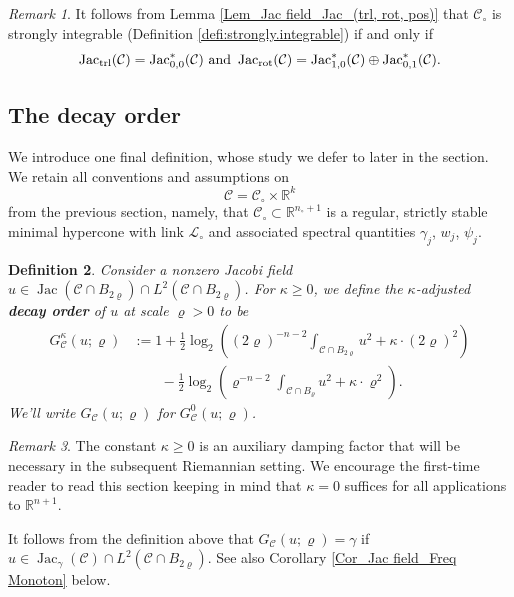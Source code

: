 \documentclass[11pt, letterpaper, reqno]{amsart}
\numberwithin{equation}{section}
\newtheorem{Def}{Definition}[section]
\theoremstyle{remark}
\newtheorem{Rem}[Def]{Remark}
\newcommand{\RR}{\mathbb{R}}
\newcommand{\cC}{\mathcal{C}}
\newcommand{\cL}{\mathcal{L}}
\newcommand{\Jac}{\operatorname{Jac}}
\begin{document}
\begin{Rem} \label{rema:strongly.integrable}
It follows from Lemma \ref{Lem_Jac field_Jac_(trl, rot, pos)} that $\cC_\circ$ is strongly integrable (Definition \ref{defi:strongly.integrable}) if and only if
\[ \Jac_\textnormal{trl}(\cC) = \Jac^*_{0,0}(\cC) \text{ and } \Jac_\textnormal{rot}(\cC) = \Jac^*_{1,0}(\cC) \oplus \Jac^*_{0,1}(\cC). \] 
\end{Rem}




\subsection{The decay order}

We introduce one final definition, whose study we defer to later in the section. We retain all   conventions and assumptions on
\[ \cC = \cC_\circ \times \RR^k \]
from the previous section, namely, that $\cC_\circ \subset \RR^{n_\circ+1}$ is a regular, strictly stable minimal hypercone with link $\cL_\circ$ and associated spectral quantities $\gamma_j$, $w_j$, $\psi_j$.

\begin{Def} \label{Def_doubling constant} \label{defi:linear.doubling.constant}
    Consider a nonzero Jacobi field $u \in \Jac(\cC \cap B_{2\varrho}) \cap L^2(\cC \cap B_{2\varrho})$. For $\kappa \geq 0$, we define the $\kappa$-adjusted \textbf{decay order} of $u$ at scale $\varrho > 0$ to be
    \begin{align*}
      G^\kappa_\cC(u; \varrho) 
      	& := 1 + \frac{1}{2}\log_2 \left((2\varrho)^{-n-2}\int_{\cC \cap B_{2\varrho}} u^2 + \kappa \cdot (2\varrho)^2\right)  \\
      	& \qquad - \frac{1}{2}\log_2\left(\varrho^{-n-2}\int_{\cC \cap B_{\varrho}} u^2 + \kappa \cdot \varrho^2 \right).
    \end{align*}
    We'll write $G_\cC(u;\varrho)$ for $G^0_\cC(u;\varrho)$. 
  \end{Def}
  
\begin{Rem} \label{rema:kappa.linear}
	The constant $\kappa \geq 0$ is an auxiliary damping factor that will be necessary in the subsequent Riemannian setting. We encourage the first-time reader to read this section keeping in mind that $\kappa = 0$ suffices for all applications to $\RR^{n+1}$.
\end{Rem}

It follows from the definition above that $G_\cC(u; \varrho) = \gamma$ if $u\in \Jac_\gamma(\cC) \cap L^2(\cC \cap B_{2\varrho})$. See also Corollary \ref{Cor_Jac field_Freq Monoton} below.
\end{document}
